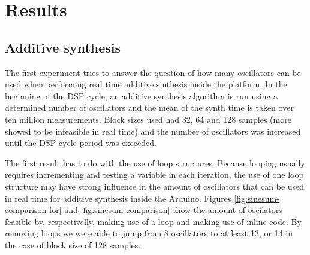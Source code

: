 
\section{Results}
\label{sec:results}


\subsection{Additive synthesis}

The first experiment tries to answer the question of how many oscillators can
be used when performing real time additive sinthesis inside the platform. In
the beginning of the DSP cycle, an additive synthesis algorithm is run using a
determined number of oscillators and the mean of the synth time is taken over
ten million measurements. Block sizes used had 32, 64 and 128 samples (more
showed to be infeasible in real time) and the number of oscillators was
increased until the DSP cycle period was exceeded.

The first result has to do with the use of loop structures. Because looping
usually requires incrementing and testing a variable in each iteration, the
use of one loop structure may have strong influence in the amount of
oscillators that can be used in real time for additive synthesis inside the
Arduino.  Figures \ref{fig:sinesum-comparison-for} and
\ref{fig:sinesum-comparison} show the amount of oscilators feasible by,
respectivelly, making use of a loop and making use of inline code. By removing
loops we were able to jump from 8 oscillators to at least 13, or 14 in the
case of block size of 128 samples.

